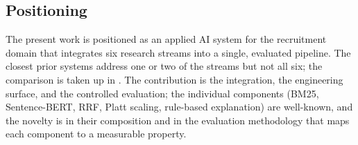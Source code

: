 \subsection{Positioning}
The present work is positioned as an applied AI system for the recruitment domain that integrates six research streams into a single, evaluated pipeline.
The closest prior systems address one or two of the streams but not all six; the comparison is taken up in .
The contribution is the integration, the engineering surface, and the controlled evaluation; the individual components (BM25, Sentence-BERT, RRF, Platt scaling, rule-based explanation) are well-known, and the novelty is in their composition and in the evaluation methodology that maps each component to a measurable property.
